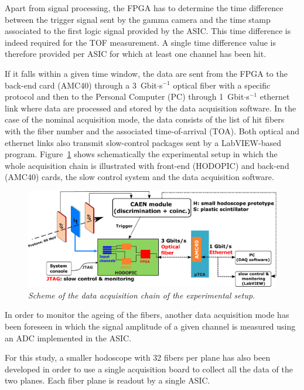 \documentclass[a4paper,11pt]{article}
\begin{document}
Apart from signal processing, the FPGA has to determine the time difference between the trigger signal sent by the gamma camera and the time stamp associated to the first logic signal provided by the ASIC. This time difference is indeed required for the TOF measurement. A single time difference value is therefore provided per ASIC for which at least one channel has been hit.

If it falls within a given time window, the data are sent from the FPGA to the back-end card (AMC40) \cite{Cachemiche2010} through a 3~Gbit$\cdot$s$^{-1}$ optical fiber with a specific protocol \cite{deng2013, Chen2017, Chen2019, Caplan2019} and then to the Personal Computer (PC) through 1~Gbit$\cdot$s$^{-1}$ ethernet link where data are processed and stored by the data acquisition software. In the case of the nominal acquisition mode, the data consists of the list of hit fibers with the fiber number and the associated time-of-arrival (TOA). Both optical and ethernet links also transmit slow-control packages sent by a LabVIEW-based program. Figure~\ref{fig:Scheme_Setup_hodo} shows schematically the experimental setup in which the whole acquisition chain is illustrated with front-end (HODOPIC) and back-end (AMC40) cards, the slow control system  and the data acquisition software.

\begin{figure}[htb]
\centering
\includegraphics[width=1\textwidth]{figures/Scheme_Setup_Nice_08_2019.pdf}
\caption{\small{\textit{Scheme of the data acquisition chain of the experimental setup.}}}
\label{fig:Scheme_Setup_hodo}
\end{figure} 

In order to monitor the ageing of the fibers, another data acquisition mode has been foreseen in which the signal amplitude of a given channel is measured using an ADC implemented in the ASIC.

For this study, a smaller hodoscope with 32 fibers per plane has also been developed in order to use a single acquisition board to collect all the data of the two planes. Each fiber plane is readout by a single ASIC.
\end{document}
